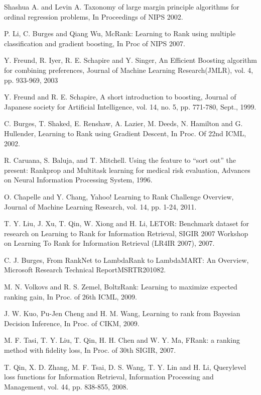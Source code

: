 \documentclass[]{article}
\begin{document}
\begin{thebibliography}{1}
  
Shashua A. and Levin A. Taxonomy of large margin principle algorithms for ordinal regression problems, In Proceedings of NIPS 2002.

 P. Li, C. Burges and Qiang Wu, McRank: Learning to Rank using
multiple classification and gradient boosting, In Proc of NIPS 2007.

 Y. Freund, R. Iyer, R. E. Schapire and Y. Singer, An Efficient Boosting algorithm for combining preferences, Journal of Machine Learning Research(JMLR), vol. 4, pp. 933-969, 2003

 Y. Freund and R. E. Schapire, A short introduction to boosting, Journal
of Japanese society for Artificial Intelligence, vol. 14, no. 5, pp. 771-780,
Sept., 1999.

 C. Burges, T. Shaked, E. Renshaw, A. Lazier, M. Deeds, N. Hamilton
and G. Hullender, Learning to Rank using Gradient Descent, In Proc. Of
22nd ICML, 2002.

 R. Caruana, S. Baluja, and T. Mitchell. Using the feature to “sort out” the
present: Rankprop and Multitask learning for medical risk evaluation,
Advances on Neural Information Processing System, 1996.

 O. Chapelle and Y. Chang, Yahoo! Learning to Rank Challenge
Overview, Journal of Machine Learning Research, vol. 14, pp. 1-24,
2011.

 T. Y. Liu, J. Xu, T. Qin, W. Xiong and H. Li, LETOR: Benchmark
dataset for research on Learning to Rank for Information Retrieval,
SIGIR 2007 Workshop on Learning To Rank for Information Retrieval
(LR4IR 2007), 2007.

 C. J. Burges, From RankNet to LambdaRank to LambdaMART: An
Overview, Microsoft Research Technical ReportMSRTR201082.

 M. N. Volkovs and R. S. Zemel, BoltzRank: Learning to maximize
expected ranking gain, In Proc. of 26th ICML, 2009.

 J. W. Kuo, Pu-Jen Cheng and H. M. Wang, Learning to rank from
Bayesian Decision Inference, In Proc. of CIKM, 2009.

 M. F. Tasi, T. Y. Liu, T. Qin, H. H. Chen and W. Y. Ma, FRank: a
ranking method with fidelity loss, In Proc. of 30th SIGIR, 2007.

 T. Qin, X. D. Zhang, M. F. Tsai, D. S. Wang, T. Y. Lin and H. Li, Querylevel loss functions for Information Retrieval, Information
Processing and Management, vol. 44, pp. 838-855, 2008.


\end{thebibliography}
\end{document}
